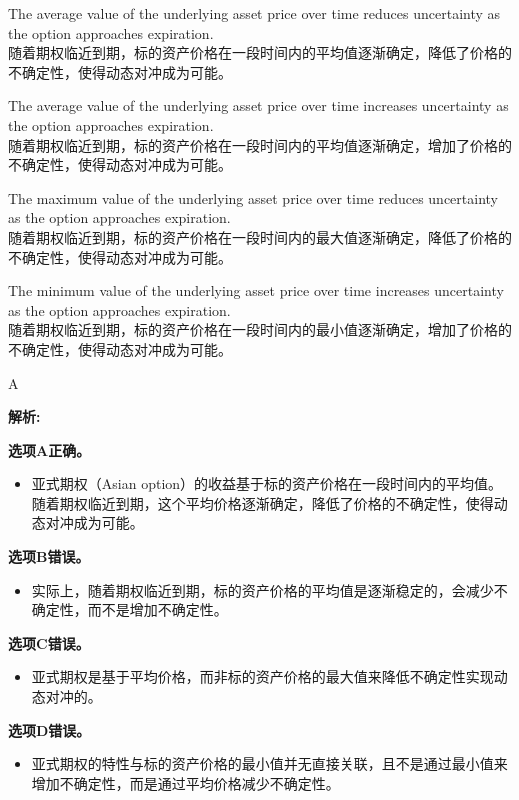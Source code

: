 \documentclass{article}
\newenvironment{explanation}
{\textbf{解析:}\par}
{\par}
\begin{document}
        \begin{choices}
            \item The average value of the underlying asset price over time reduces uncertainty as the option approaches expiration.\\
            随着期权临近到期，标的资产价格在一段时间内的平均值逐渐确定，降低了价格的不确定性，使得动态对冲成为可能。
            \item The average value of the underlying asset price over time increases uncertainty as the option approaches expiration.\\
            随着期权临近到期，标的资产价格在一段时间内的平均值逐渐确定，增加了价格的不确定性，使得动态对冲成为可能。
            \item The maximum value of the underlying asset price over time reduces uncertainty as the option approaches expiration.\\
            随着期权临近到期，标的资产价格在一段时间内的最大值逐渐确定，降低了价格的不确定性，使得动态对冲成为可能。
            \item The minimum value of the underlying asset price over time increases uncertainty as the option approaches expiration.\\
            随着期权临近到期，标的资产价格在一段时间内的最小值逐渐确定，增加了价格的不确定性，使得动态对冲成为可能。
        \end{choices}
        
        \begin{correctanswer}
        A
        \end{correctanswer}
        
        \begin{explanation}
        \textbf{选项A正确。}
        \begin{itemize}
        \item 亚式期权（Asian option）的收益基于标的资产价格在一段时间内的平均值。随着期权临近到期，这个平均价格逐渐确定，降低了价格的不确定性，使得动态对冲成为可能。
        \end{itemize}
        \textbf{选项B错误。}
        \begin{itemize}
        \item 实际上，随着期权临近到期，标的资产价格的平均值是逐渐稳定的，会减少不确定性，而不是增加不确定性。
        \end{itemize}
        \textbf{选项C错误。}
        \begin{itemize}
        \item 亚式期权是基于平均价格，而非标的资产价格的最大值来降低不确定性实现动态对冲的。
        \end{itemize}
        \textbf{选项D错误。}
        \begin{itemize}
        \item 亚式期权的特性与标的资产价格的最小值并无直接关联，且不是通过最小值来增加不确定性，而是通过平均价格减少不确定性。
        \end{itemize}
        \end{explanation}
        
\end{document}

